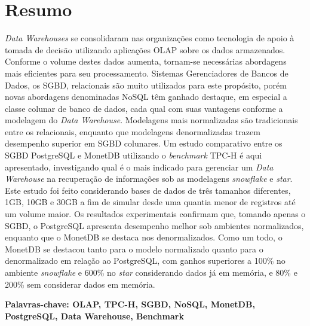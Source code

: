 
\chapter*{Resumo}

\noindent

\textit{Data Warehouses} se consolidaram nas organizações como tecnologia de apoio à tomada de decisão utilizando aplicações OLAP sobre os dados armazenados. Conforme o volume destes dados aumenta, tornam-se necessárias abordagens mais eficientes para seu processamento. Sistemas Gerenciadores de Bancos de Dados, os SGBD, relacionais são muito utilizados para este propósito, porém novas abordagens denominadas NoSQL têm ganhado destaque, em especial a classe colunar de banco de dados, cada qual com suas vantagens conforme a modelagem do \textit{Data Warehouse}. Modelagens mais normalizadas são tradicionais entre os relacionais, enquanto que modelagens denormalizadas trazem desempenho superior em SGBD colunares. Um estudo comparativo entre os SGBD PostgreSQL e MonetDB utilizando o \textit{benchmark} TPC-H é aqui apresentado, investigando qual é o mais indicado para gerenciar um \textit{Data Warehouse} na recuperação de informações sob as modelagens \textit{snowflake} e \textit{star}. Este estudo foi feito considerando bases de dados de três tamanhos diferentes, 1GB, 10GB e 30GB a fim de simular desde uma quantia menor de registros até um volume maior. Os resultados experimentais confirmam que, tomando apenas o SGBD, o PostgreSQL apresenta desempenho melhor sob ambientes normalizados, enquanto que o MonetDB se destaca nos denormalizados. Como um todo, o MonetDB se destacou tanto para o modelo normalizado quanto para o denormalizado em relação ao PostgreSQL, com ganhos superiores a 100\% no ambiente \textit{snowflake} e 600\% no \textit{star} considerando dados já em memória, e 80\% e 200\% sem considerar dados em memória.


\vspace{1cm}
\noindent
\textbf{Palavras-chave: OLAP, TPC-H, SGBD, NoSQL, MonetDB, PostgreSQL, Data Warehouse, Benchmark}



